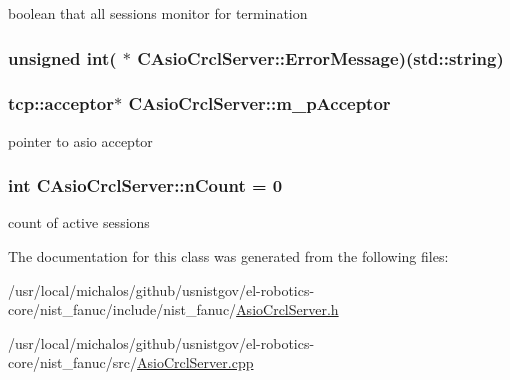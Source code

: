 boolean that all sessions monitor for termination \hypertarget{classCAsioCrclServer_a705b81d958ac4521f086761c30a9eda8}{
\subsubsection[{Error\-Message}]{\setlength{\rightskip}{0pt plus 5cm}unsigned int( $\ast$ C\-Asio\-Crcl\-Server\-::\-Error\-Message)(std\-::string)}}\label{classCAsioCrclServer_a705b81d958ac4521f086761c30a9eda8}
\hypertarget{classCAsioCrclServer_a3683f25664211e9bd73bdfb6dfe68f00}{
\subsubsection[{m\-\_\-p\-Acceptor}]{\setlength{\rightskip}{0pt plus 5cm}tcp\-::acceptor$\ast$ C\-Asio\-Crcl\-Server\-::m\-\_\-p\-Acceptor}}\label{classCAsioCrclServer_a3683f25664211e9bd73bdfb6dfe68f00}
pointer to asio acceptor \hypertarget{classCAsioCrclServer_ac5689559a71c457e5b397719d7dd11b6}{
\subsubsection[{n\-Count}]{\setlength{\rightskip}{0pt plus 5cm}int C\-Asio\-Crcl\-Server\-::n\-Count = 0\hspace{0.3cm}{\ttfamily [static]}}}\label{classCAsioCrclServer_ac5689559a71c457e5b397719d7dd11b6}
count of active sessions 

The documentation for this class was generated from the following files\-:\begin{DoxyCompactItemize}
\item 
/usr/local/michalos/github/usnistgov/el-\/robotics-\/core/nist\-\_\-fanuc/include/nist\-\_\-fanuc/\hyperlink{AsioCrclServer_8h}{Asio\-Crcl\-Server.\-h}\item 
/usr/local/michalos/github/usnistgov/el-\/robotics-\/core/nist\-\_\-fanuc/src/\hyperlink{AsioCrclServer_8cpp}{Asio\-Crcl\-Server.\-cpp}\end{DoxyCompactItemize}
